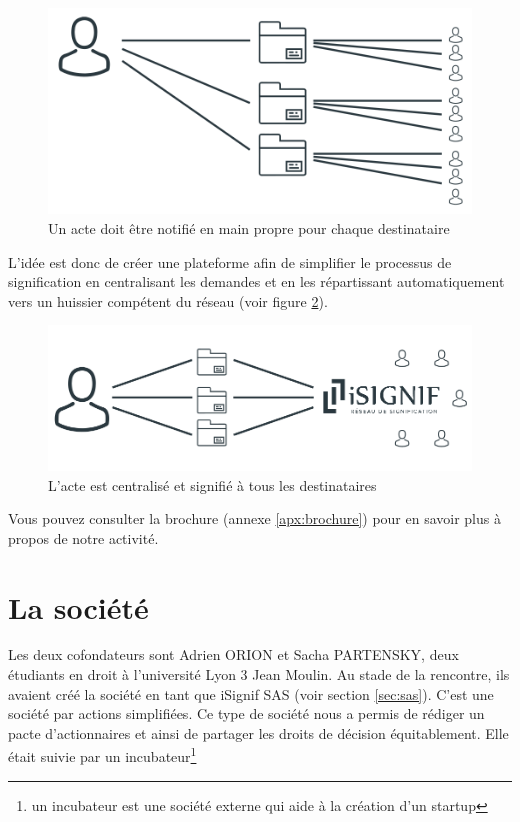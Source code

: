\documentclass[]{report}
\begin{document}
    \begin{figure}[!h]
      \includegraphics[width=\linewidth]{img/signification_before.png}
      \caption{Un acte doit être notifié en main propre pour chaque destinataire}
      \label{fig:signification_before}
    \end{figure}

    L'idée est donc de créer une plateforme afin de simplifier le processus de signification en centralisant les demandes et en les répartissant automatiquement vers un huissier compétent du réseau  (voir figure \ref{fig:signification_after}).

    \begin{figure}[!h]
      \includegraphics[width=\linewidth]{img/signification_after.png}
      \caption{L'acte est centralisé et signifié à tous les destinataires}
      \label{fig:signification_after}
    \end{figure}

    Vous pouvez consulter la brochure (annexe \ref{apx:brochure}) pour en savoir plus à propos de notre activité.






  \section{La société}

    Les deux cofondateurs sont Adrien ORION et Sacha PARTENSKY, deux étudiants en droit à l’université Lyon 3 Jean Moulin. Au stade de la rencontre, ils avaient créé la société en tant que iSignif SAS (voir section \ref{sec:sas}). C'est une société par actions simplifiées. Ce type de société nous a permis de rédiger un pacte d'actionnaires et ainsi de partager les droits de décision équitablement. Elle était suivie par un incubateur\footnote{un incubateur est une société externe qui aide à la création d'un startup}
\end{document}
